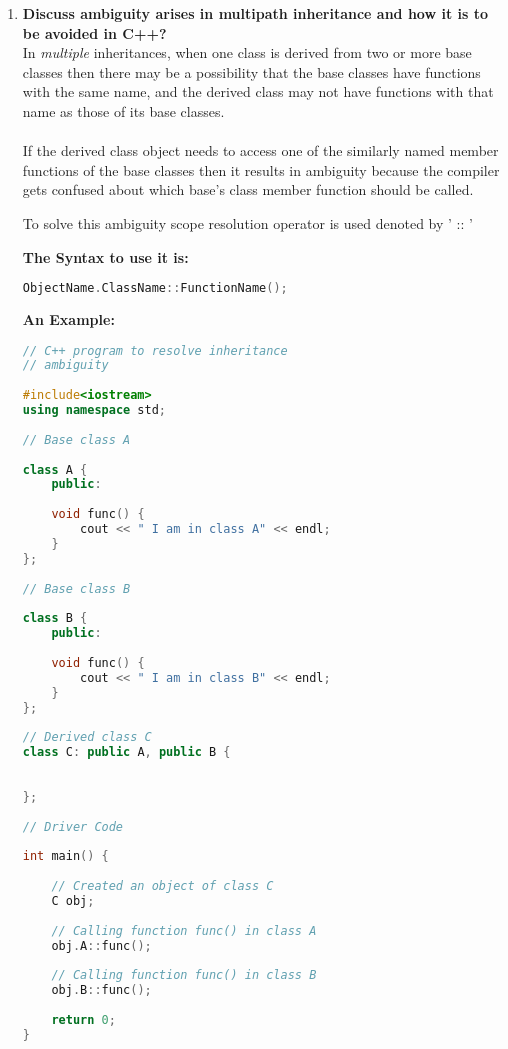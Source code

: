 \documentclass[11pt]{article}
\begin{document}
\begin{enumerate}
	\item \textbf{Discuss ambiguity arises in multipath inheritance and how it is to be avoided in C++?}\\
	      In \textit{multiple} inheritances, when one class is derived from two or more base classes then there may be a possibility that the base classes have functions with the same name, and the derived class may not have functions with that name as those of its base classes. \\
	      \\
	      If the derived class object needs to access one of the similarly named member functions of the base classes then it results in ambiguity because the compiler gets confused about which base's class member function should be called.

	      To solve this ambiguity scope resolution operator is used denoted by ' :: '

	      \textbf{The Syntax to use it is: }
	      \begin{lstlisting}[language=C++]
		ObjectName.ClassName::FunctionName();
	\end{lstlisting}

	      \textbf{An Example: }
	      \begin{lstlisting}[language=C++]
// C++ program to resolve inheritance
// ambiguity
 
#include<iostream>
using namespace std;
 
// Base class A
 
class A {
    public:
 
    void func() {
        cout << " I am in class A" << endl;
    }
};
 
// Base class B
 
class B {
    public:
 
    void func() {
        cout << " I am in class B" << endl;
    }
};
 
// Derived class C
class C: public A, public B {
 
 
};
 
// Driver Code
 
int main() {
 
    // Created an object of class C
    C obj;
 
    // Calling function func() in class A
    obj.A::func();
 
    // Calling function func() in class B
    obj.B::func();
 
    return 0;
}
		

\end{lstlisting}
\end{enumerate}
\end{document}
